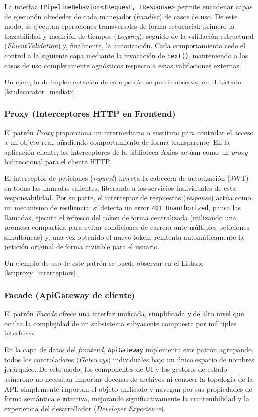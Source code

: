 La interfaz \texttt{IPipelineBehavior<TRequest, TResponse>} permite encadenar capas de ejecución alrededor de cada manejador (\emph{handler}) de casos de uso. De este modo, se ejecutan operaciones transversales de forma secuencial: primero la trazabilidad y medición de tiempos (\emph{Logging}), seguido de la validación estructural (\emph{FluentValidation}) y, finalmente, la autorización. Cada comportamiento cede el control a la siguiente capa mediante la invocación de \texttt{next()}, manteniendo a los casos de uso completamente agnósticos respecto a estas validaciones externas.

Un ejemplo de implementación de este patrón se puede observar en el Listado \ref{lst:decorator_mediatr}.

\subsubsection{Proxy (Interceptores HTTP en Frontend)}
El patrón \emph{Proxy} proporciona un intermediario o sustituto para controlar el acceso a un objeto real, añadiendo comportamiento de forma transparente. En la aplicación cliente, los interceptores de la biblioteca Axios actúan como un \emph{proxy} bidireccional para el cliente \ac{HTTP}.

El interceptor de peticiones (\emph{request}) inyecta la cabecera de autorización (\ac{JWT}) en todas las llamadas salientes, liberando a los servicios individuales de esta responsabilidad. Por su parte, el interceptor de respuestas (\emph{response}) actúa como un mecanismo de resiliencia: si detecta un error \texttt{401 Unauthorized}, pausa las llamadas, ejecuta el refresco del token de forma centralizada (utilizando una promesa compartida para evitar condiciones de carrera  ante múltiples peticiones simultáneas) y, una vez obtenido el nuevo token, reintenta automáticamente la petición original de forma invisible para el usuario.

Un ejemplo de uso de este patrón se puede observar en el Listado \ref{lst:proxy_interceptors}.

\subsubsection{Facade (ApiGateway de cliente)}
El patrón \emph{Facade} ofrece una interfaz unificada, simplificada y de alto nivel que oculta la complejidad de un subsistema subyacente compuesto por múltiples interfaces.

En la capa de datos del \emph{frontend}, \texttt{ApiGateway} implementa este patrón agrupando todos los controladores (\emph{Gateways}) individuales bajo un único espacio de nombres jerárquico. De este modo, los componentes de \ac{UI} y los gestores de estado asíncrono no necesitan importar docenas de archivos ni conocer la topología de la \ac{API}, simplemente importan el objeto unificado y navegan por sus propiedades de forma semántica e intuitiva, mejorando significativamente la mantenibilidad y la experiencia del desarrollador (\emph{Developer Experience}).

